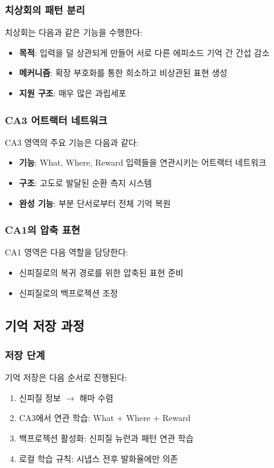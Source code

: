 \documentclass[openany]{book}
\begin{document}
\begin{appendices}
\subsubsection{치상회의 패턴 분리}
치상회는 다음과 같은 기능을 수행한다:

\begin{itemize}
\item \textbf{목적}: 입력을 덜 상관되게 만들어 서로 다른 에피소드 기억 간 간섭 감소
\item \textbf{메커니즘}: 확장 부호화를 통한 희소하고 비상관된 표현 생성
\item \textbf{지원 구조}: 매우 많은 과립세포
\end{itemize}

\subsubsection{CA3 어트랙터 네트워크}
CA3 영역의 주요 기능은 다음과 같다:

\begin{itemize}
\item \textbf{기능}: What, Where, Reward 입력들을 연관시키는 어트랙터 네트워크
\item \textbf{구조}: 고도로 발달된 순환 측지 시스템
\item \textbf{완성 기능}: 부분 단서로부터 전체 기억 복원
\end{itemize}

\subsubsection{CA1의 압축 표현}
CA1 영역은 다음 역할을 담당한다:

\begin{itemize}
\item 신피질로의 복귀 경로를 위한 압축된 표현 준비
\item 신피질로의 백프로젝션 조정
\end{itemize}

\subsection{기억 저장 과정}

\subsubsection{저장 단계}
기억 저장은 다음 순서로 진행된다:

\begin{enumerate}
\item 신피질 정보 $\rightarrow$ 해마 수렴
\item CA3에서 연관 학습: What + Where + Reward
\item 백프로젝션 활성화: 신피질 뉴런과 패턴 연관 학습
\item 로컬 학습 규칙: 시냅스 전후 발화율에만 의존
\end{enumerate}


\end{appendices}
\end{document}
